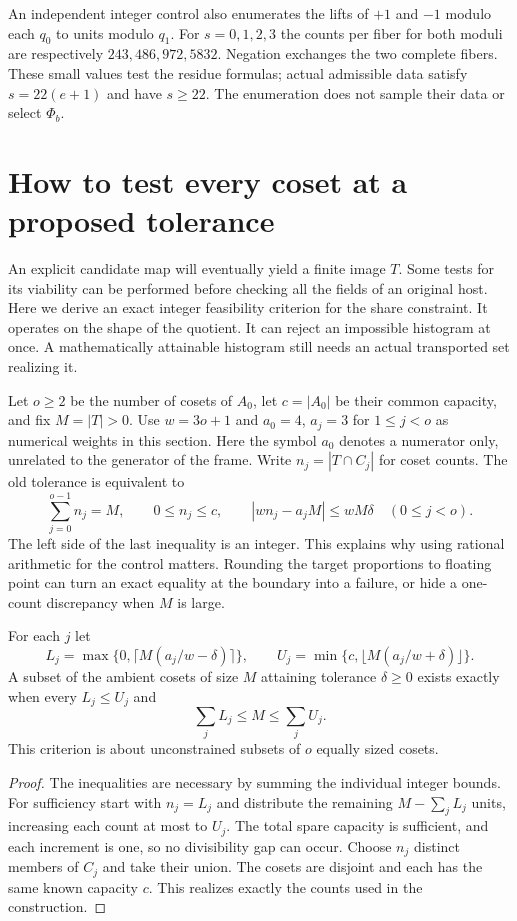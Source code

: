 \documentclass[12pt,letterpaper]{article}
\begin{document}
An independent integer control also enumerates the lifts of $+1$ and $-1$ modulo each $q_0$ to units modulo $q_1$. For $s=0,1,2,3$ the counts per fiber for both moduli are respectively $243,486,972,5832$. Negation exchanges the two complete fibers. These small values test the residue formulas; actual admissible data satisfy $s=22(e+1)$ and have $s\ge22$. The enumeration does not sample their data or select $\Phi_b$.

\section{How to test every coset at a proposed tolerance}\label{sec:quota}
An explicit candidate map will eventually yield a finite image $T$. Some tests for its viability can be performed before checking all the fields of an original host. Here we derive an exact integer feasibility criterion for the share constraint. It operates on the shape of the quotient. It can reject an impossible histogram at once. A mathematically attainable histogram still needs an actual transported set realizing it.

Let $o\ge2$ be the number of cosets of $A_0$, let $c=|A_0|$ be their common capacity, and fix $M=|T|>0$. Use $w=3o+1$ and $a_0=4$, $a_j=3$ for $1\le j<o$ as numerical weights in this section. Here the symbol $a_0$ denotes a numerator only, unrelated to the generator of the frame. Write $n_j=|T\cap C_j|$ for coset counts. The old tolerance is equivalent to
\[
 \sum_{j=0}^{o-1}n_j=M,\qquad 0\le n_j\le c,\qquad
        |w n_j-a_j M|\le wM\delta\quad(0\le j<o).
\]
The left side of the last inequality is an integer. This explains why using rational arithmetic for the control matters. Rounding the target proportions to floating point can turn an exact equality at the boundary into a failure, or hide a one-count discrepancy when $M$ is large.

\begin{proposition}\label{prop:interval}
For each $j$ let
\[
 L_j=\max\{0,\lceil M(a_j/w-\delta)\rceil\},\qquad
 U_j=\min\{c,\lfloor M(a_j/w+\delta)\rfloor\}.
\]
A subset of the ambient cosets of size $M$ attaining tolerance $\delta\ge0$ exists exactly when every $L_j\le U_j$ and
\[
                      \sum_j L_j\le M\le\sum_j U_j.
\]
This criterion is about unconstrained subsets of $o$ equally sized cosets.
\end{proposition}
\begin{proof}
The inequalities are necessary by summing the individual integer bounds. For sufficiency start with $n_j=L_j$ and distribute the remaining $M-\sum_j L_j$ units, increasing each count at most to $U_j$. The total spare capacity is sufficient, and each increment is one, so no divisibility gap can occur. Choose $n_j$ distinct members of $C_j$ and take their union. The cosets are disjoint and each has the same known capacity $c$. This realizes exactly the counts used in the construction.
\end{proof}
\end{document}
